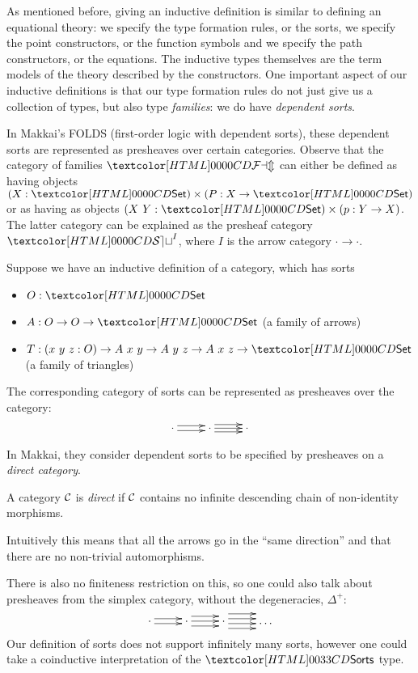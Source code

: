 As mentioned before, giving an inductive definition is similar to
defining an equational theory: we specify the type formation rules, or
the sorts, we specify the point constructors, or the function symbols
and we specify the path constructors, or the equations. The inductive
types themselves are the term models of the theory described by the
constructors. One important aspect of our inductive definitions is
that our type formation rules do not just give us a collection of
types, but also type \emph{families}: we do have \emph{dependent
  sorts}.

In Makkai's FOLDS (first-order logic with dependent sorts), these
dependent sorts are represented as presheaves over certain
categories. Observe that the category of families $\FAM$ can either be
defined as having objects $(X : \Set) \times (P : X \to \Set)$ or as
having as objects $(X\ Y : \Set) \times (p : Y \to X)$. The latter
category can be explained as the presheaf category $\SET^I$, where $I$
is the arrow category $\cdot \to \cdot$.

\begin{example}
  Suppose we have an inductive definition of a category, which has
  sorts
%
  \begin{itemize}
  \item $O : \Set$
  \item $A : O \to O \to \Set$ (a family of arrows)
  \item $T : (x\ y\ z : O) \to A\ x\ y \to A\ y\ z \to A\ x\ z \to \Set$
    (a family of triangles)
  \end{itemize}
%
  The corresponding category of sorts can be represented as presheaves
  over the category:
$$
\xymatrix{ \cdot \ar@<-.5ex>[r] \ar@<.5ex>[r] &\cdot \ar@<-.75ex>[r]
  \ar@<.0ex>[r] \ar@<.75ex>[r] &\cdot }
$$
\end{example}

In Makkai, they consider dependent sorts to be specified by presheaves
on a \emph{direct category}.
\begin{definition}
  A category $\mathcal{C}$ is \emph{direct} if $\mathcal{C}$ contains no infinite
  descending chain of non-identity morphisms.
\end{definition}
Intuitively this means that all the arrows go in the ``same
direction'' and that there are no non-trivial automorphisms.

There is also no finiteness restriction on this, so one could also
talk about presheaves from the simplex category, without the
degeneracies, $\Delta^+$:
$$
\xymatrix{
\cdot     
\ar@<-.5ex>[r]
\ar@<.5ex>[r]
&\cdot
\ar@<-1ex>[r]
\ar@<0ex>[r]
\ar@<1ex>[r]
&\cdot
\ar@<-1.5ex>[r]
\ar@<-.5ex>[r]
\ar@<.5ex>[r]
\ar@<1.5ex>[r]
&\hdots
}
$$
Our definition of sorts does not support infinitely many sorts,
however one could take a coinductive interpretation of the $\sortsty$
type.

